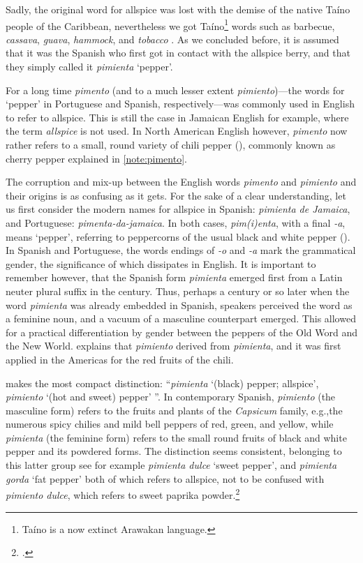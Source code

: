 Sadly, the original word for allspice was lost with the demise of the native Taíno people of the Caribbean, nevertheless we got Taíno\footnote{Taíno is a now extinct Arawakan language.} words such as barbecue, \textit{cassava}, \textit{guava}, \textit{hammock}, and \textit{tobacco} \autocite[229]{rafinesque_american_1836}. As we concluded before, it is assumed that it was the Spanish who first got in contact with the allspice berry, and that they simply called it \textit{pimienta} `pepper'.



For a long time \textit{pimento} (and to a much lesser extent \textit{pimiento})---the words for `pepper' in Portuguese and Spanish, respectively---was commonly used in English to refer to allspice. This is still the case in Jamaican English for example, where the term \textit{allspice} is not used. In North American English however, \textit{pimento} now rather refers to a small, round variety of chili pepper (), commonly known as cherry pepper explained in \cref{note:pimento}. 

The corruption and mix-up between the English words \textit{pimento} and \textit{pimiento} and their origins is as confusing as it gets. For the sake of a clear understanding, let us first consider the modern names for allspice in Spanish: \textit{pimienta de Jamaica}, and Portuguese: \textit{pimenta-da-jamaica}. In both cases, \textit{pim\-(i)enta}, with a final \textit{-a}, means `pepper', referring to peppercorns of the usual black and white pepper (). In Spanish and Portuguese, the words endings of \textit{-o} and \textit{-a} mark the grammatical gender, the significance of which dissipates in English. It is important to remember however, that the Spanish form \textit{pimienta} emerged first from a Latin neuter plural suffix in the  century. Thus, perhaps a century or so later when the word \textit{pimienta} was already embedded in Spanish, speakers perceived the word as a feminine noun, and a vacuum of a masculine counterpart emerged. This allowed for a practical differentiation by gender between the peppers of the Old Word and the New World. \textcite[459]{corominas_breve_1987} explains that \textit{pimiento} derived from \textit{pimienta}, and it was first applied in the Americas for the red fruits of the chili.

\textcite[415]{gomez_de_silva_elseviers_1985} makes the most compact distinction: ``\textit{pimienta} `(black) pepper; allspice', \textit{pimiento} `(hot and sweet) pepper' ''. In contemporary Spanish, \textit{pimiento} (the masculine form) refers to the fruits and plants of the \textit{Capsicum} family, e.g.,the numerous spicy chilies and mild bell peppers of red, green, and yellow, while \textit{pimienta} (the feminine form) refers to the small round fruits of black and white pepper and its powdered forms. The distinction seems consistent, belonging to this latter group see for example \textit{pimienta dulce} `sweet pepper', and \textit{pimienta gorda} `fat pepper' both of which refers to allspice, not to be confused with \textit{pimiento dulce}, which refers to sweet paprika powder.\footcite[pimiento, -a]{dle}

